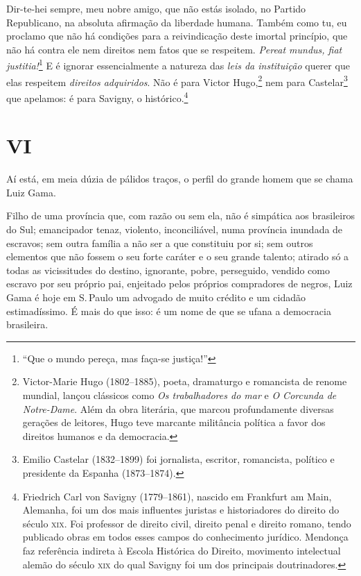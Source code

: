 Dir-te-hei sempre, meu nobre amigo, que não estás isolado, no Partido
Republicano, na absoluta afirmação da liberdade humana. Também como tu,
eu proclamo que não há condições para a reivindicação deste imortal
princípio, que não há contra ele nem direitos nem fatos que se
respeitem. \emph{Pereat mundus, fiat justitia!}\footnote{``Que o mundo
  pereça, mas faça-se justiça!''} E é ignorar essencialmente a natureza
das \emph{leis da instituição} querer que elas respeitem \emph{direitos
adquiridos}. Não é para Victor Hugo,\footnote{Victor-Marie Hugo
  (1802--1885), poeta, dramaturgo e romancista de renome mundial, lançou
  clássicos como \emph{Os trabalhadores do mar} e \emph{O Corcunda de Notre-Dame}.
  Além da obra literária, que marcou profundamente diversas gerações de
  leitores, Hugo teve marcante militância política a favor dos direitos
  humanos e da democracia.} nem para Castelar\footnote{Emilio
  Castelar (1832--1899) foi jornalista, escritor, romancista, político e
  presidente da Espanha (1873--1874).} que apelamos: é para Savigny, o
histórico.\footnote{Friedrich Carl von Savigny (1779--1861), nascido em
  Frankfurt am Main, Alemanha, foi um dos mais influentes juristas e
  historiadores do direito do século \textsc{xix}. Foi professor de direito
  civil, direito penal e direito romano, tendo publicado obras em todos
  esses campos do conhecimento jurídico. Mendonça faz referência
  indireta à Escola Histórica do Direito, movimento intelectual alemão
  do século \textsc{xix} do qual Savigny foi um dos principais doutrinadores.}

\section*{VI}

Aí está, em meia dúzia de pálidos traços, o perfil do grande homem que
se chama Luiz Gama.

Filho de uma província que, com razão ou sem ela, não é simpática aos
brasileiros do Sul; emancipador tenaz, violento, inconciliável, numa
província inundada de escravos; sem outra família a não ser a que
constituiu por si; sem outros elementos que não fossem o seu forte
caráter e o seu grande talento; atirado só a todas as vicissitudes do
destino, ignorante, pobre, perseguido, vendido como escravo por seu
próprio pai, enjeitado pelos próprios compradores de negros, Luiz Gama é
hoje em S.\,Paulo um advogado de muito crédito e um cidadão
estimadíssimo. É mais do que isso: é um nome de que se ufana a
democracia brasileira.


